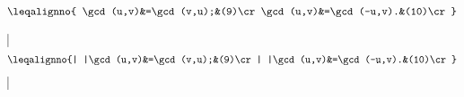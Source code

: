 


$$\leqalignno{
\gcd(u,v)&=\gcd(v,u);&(9)\cr
\gcd(u,v)&=\gcd(-u,v).&(10)\cr}$$

\bigskip

\respuestaS

|$$\leqalignno{|

|\gcd(u,v)&=\gcd(v,u);&(9)\cr|

|\gcd(u,v)&=\gcd(-u,v).&(10)\cr}$$|

\bye

